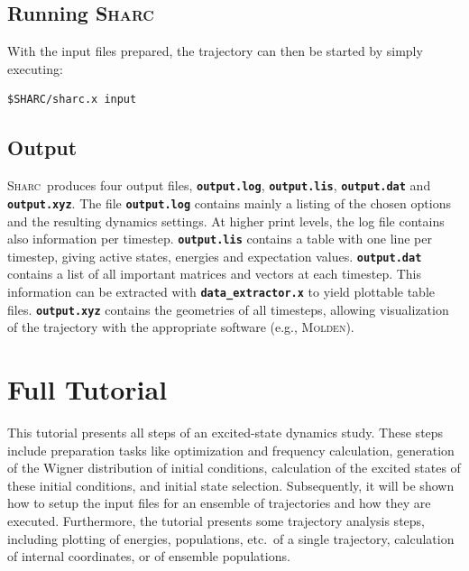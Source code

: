 \documentclass[a4paper,11pt,DIV=15,openany]{scrbook}
\newcommand{\sharc}{\textsc{Sharc}}
\newcommand{\ttt}[1]{\textbf{\texttt{#1}}}
\newenvironment{example}{
  \vspace{0mm}
  \definecolor{shadecolor}{HTML}{E4F4FF}
  \begin{shaded}
}{
  \end{shaded}
}
\begin{document}
\section{Running \sharc}

With the input files prepared, the trajectory can then be started by simply executing:
\begin{example}\vspace{-8mm}
\begin{verbatim}
$SHARC/sharc.x input 
\end{verbatim}\vspace{-5mm}
\end{example}

\section{Output}

\sharc\ produces four output files, \ttt{output.log}, \ttt{output.lis}, \ttt{output.dat} and \ttt{output.xyz}. 
The file \ttt{output.log} contains mainly a listing of the chosen options and the resulting dynamics settings. 
At higher print levels, the log file contains also information per timestep. 
\ttt{output.lis} contains a table with one line per timestep, giving active states, energies and expectation values.
\ttt{output.dat} contains a list of all important matrices and vectors at each timestep. 
This information can be extracted with \ttt{data\_extractor.x} to yield plottable table files. 
\ttt{output.xyz} contains the geometries of all timesteps, allowing visualization of the trajectory with the appropriate software (e.g., \textsc{Molden}).






\chapter{Full Tutorial}\label{chap:full}

This tutorial presents all steps of an excited-state dynamics study. 
These steps include preparation tasks like optimization and frequency calculation, generation of the Wigner distribution of initial conditions, calculation of the excited states of these initial conditions, and initial state selection. 
Subsequently, it will be shown how to setup the input files for an ensemble of trajectories and how they are executed.
Furthermore, the tutorial presents some trajectory analysis steps, including plotting of energies, populations, etc.\ of a single trajectory, calculation of internal coordinates, or of ensemble populations.
\end{document}
